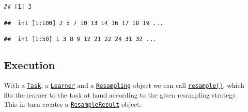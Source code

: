 \documentclass[]{scrbook}
\newenvironment{Shaded}{\begin{snugshade}}{\end{snugshade}}
\newcommand{\DataTypeTok}[1]{\textcolor[rgb]{0.13,0.29,0.53}{#1}}
\newcommand{\DecValTok}[1]{\textcolor[rgb]{0.00,0.00,0.81}{#1}}
\newcommand{\KeywordTok}[1]{\textcolor[rgb]{0.13,0.29,0.53}{\textbf{#1}}}
\newcommand{\NormalTok}[1]{#1}
\newcommand{\OperatorTok}[1]{\textcolor[rgb]{0.81,0.36,0.00}{\textbf{#1}}}
\newcommand{\StringTok}[1]{\textcolor[rgb]{0.31,0.60,0.02}{#1}}
\renewenvironment{Shaded} {\begin{snugshade}\small} {\end{snugshade}}
\begin{document}
\begin{Shaded}
\end{Shaded}

\begin{verbatim}
## [1] 3
\end{verbatim}

\begin{Shaded}
\end{Shaded}

\begin{verbatim}
##  int [1:100] 2 5 7 10 13 14 16 17 18 19 ...
\end{verbatim}

\begin{Shaded}
\end{Shaded}

\begin{verbatim}
##  int [1:50] 1 3 8 9 12 21 22 24 31 32 ...
\end{verbatim}

\hypertarget{resampling-exec}{%
\subsection{Execution}\label{resampling-exec}}

With a \href{https://mlr3.mlr-org.com/reference/Task.html}{\texttt{Task}}, a \href{https://mlr3.mlr-org.com/reference/Learner.html}{\texttt{Learner}} and a \href{https://mlr3.mlr-org.com/reference/Resampling.html}{\texttt{Resampling}} object we can call \href{https://mlr3.mlr-org.com/reference/resample.html}{\texttt{resample()}}, which fits the learner to the task at hand according to the given resampling strategy.
This in turn creates a \href{https://mlr3.mlr-org.com/reference/ResampleResult.html}{\texttt{ResampleResult}} object.
\end{document}
